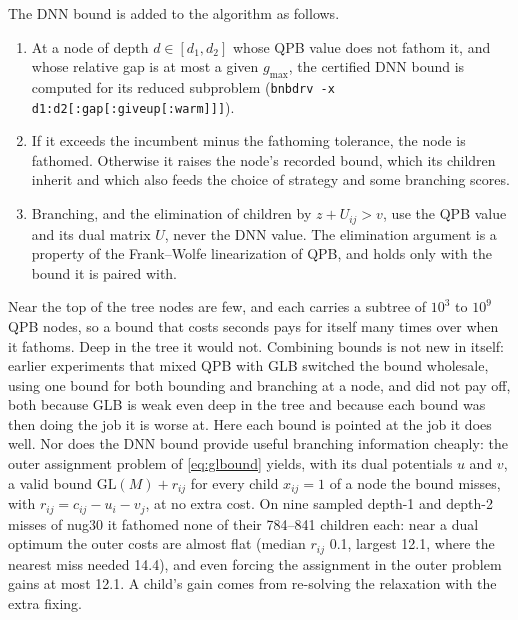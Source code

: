 \documentclass[10pt]{article}
\theoremstyle{remark}
\newcommand{\GL}{\mathrm{GL}}
\begin{document}
The DNN bound is added to the algorithm as follows.
\begin{enumerate}
\item At a node of depth $d\in[d_1,d_2]$ whose QPB value does not fathom it, and
  whose relative gap is at most a given $g_{\max}$, the certified DNN bound is
  computed for its reduced subproblem (\texttt{bnbdrv -x
  d1:d2[:gap[:giveup[:warm]]]}).
\item If it exceeds the incumbent minus the fathoming tolerance, the node is
  fathomed. Otherwise it raises the node's recorded bound, which its children
  inherit and which also feeds the choice of strategy and some branching scores.
\item Branching, and the elimination of children by $z + U_{ij} > v$, use the QPB
  value and its dual matrix $U$, never the DNN value. The elimination argument is a
  property of the Frank--Wolfe linearization of QPB, and holds only with the bound
  it is paired with.
\end{enumerate}

Near the top of the tree nodes are few, and each carries a subtree of $10^3$ to
$10^9$ QPB nodes, so a bound that costs seconds pays for itself many times over
when it fathoms. Deep in the tree it would not. Combining bounds is not new in
itself: earlier experiments that mixed QPB with GLB \cite{thesis} switched the bound
wholesale, using one bound for both bounding and branching at a node, and did not
pay off, both because GLB is weak even deep in the tree and because each bound was
then doing the job it is worse at. Here each bound is pointed at the job it does
well. Nor does the DNN bound provide
useful branching information cheaply: the outer assignment problem of
\eqref{eq:glbound} yields, with its dual potentials $u$ and $v$, a valid bound
$\GL(M) + r_{ij}$ for every child $x_{ij}=1$ of a node the bound misses, with
$r_{ij} = c_{ij}-u_i-v_j$, at no extra cost. On nine sampled depth-1 and depth-2
misses of nug30 it fathomed none of their 784--841 children each: near a dual
optimum the outer costs are almost flat (median $r_{ij}$ 0.1, largest 12.1, where the
nearest miss needed 14.4), and even forcing the assignment in the outer problem gains
at most 12.1. A child's gain comes from re-solving the relaxation with the extra
fixing.
\end{document}
